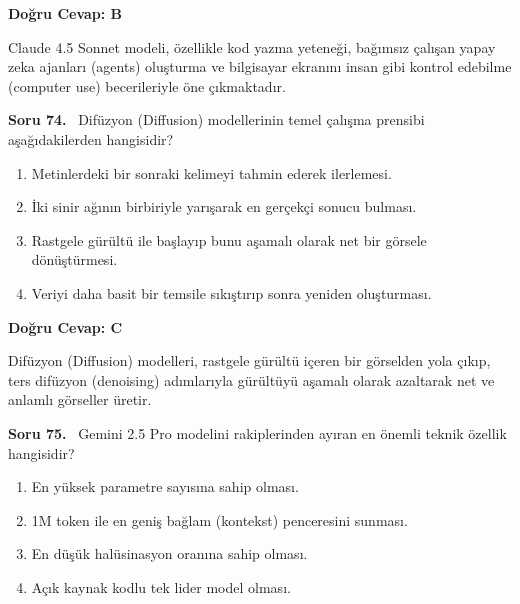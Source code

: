 \documentclass[11pt,a4paper,openany]{book}
\begin{document}
\vspace{4pt}
\begin{tcolorbox}[title=Cevap ve Açıklama, colback=gray!3!white, colframe=primarycolor!90!black, arc=2mm, fonttitle=\bfseries\sffamily, top=6pt, bottom=6pt]
    \textbf{Doğru Cevap: B}

    \vspace{2pt}
    Claude 4.5 Sonnet modeli, özellikle kod yazma yeteneği, bağımsız çalışan yapay zeka ajanları (agents) oluşturma ve bilgisayar ekranını insan gibi kontrol edebilme (computer use) becerileriyle öne çıkmaktadır.
\end{tcolorbox}
\vspace{10pt}
\needspace{5cm}
\vspace{8pt}
\noindent\textbf{\large\sffamily Soru 74.} \ Difüzyon (Diffusion) modellerinin temel çalışma prensibi aşağıdakilerden hangisidir?

\begin{enumerate}[label=\Alph*), leftmargin=25pt, topsep=4pt, itemsep=2pt]
        \item Metinlerdeki bir sonraki kelimeyi tahmin ederek ilerlemesi.
        \item İki sinir ağının birbiriyle yarışarak en gerçekçi sonucu bulması.
        \item Rastgele gürültü ile başlayıp bunu aşamalı olarak net bir görsele dönüştürmesi.
        \item Veriyi daha basit bir temsile sıkıştırıp sonra yeniden oluşturması.
\end{enumerate}

\vspace{4pt}
\begin{tcolorbox}[title=Cevap ve Açıklama, colback=gray!3!white, colframe=primarycolor!90!black, arc=2mm, fonttitle=\bfseries\sffamily, top=6pt, bottom=6pt]
    \textbf{Doğru Cevap: C}

    \vspace{2pt}
    Difüzyon (Diffusion) modelleri, rastgele gürültü içeren bir görselden yola çıkıp, ters difüzyon (denoising) adımlarıyla gürültüyü aşamalı olarak azaltarak net ve anlamlı görseller üretir.
\end{tcolorbox}
\vspace{10pt}
\needspace{5cm}
\vspace{8pt}
\noindent\textbf{\large\sffamily Soru 75.} \ Gemini 2.5 Pro modelini rakiplerinden ayıran en önemli teknik özellik hangisidir?

\begin{enumerate}[label=\Alph*), leftmargin=25pt, topsep=4pt, itemsep=2pt]
        \item En yüksek parametre sayısına sahip olması.
        \item 1M token ile en geniş bağlam (kontekst) penceresini sunması.
        \item En düşük halüsinasyon oranına sahip olması.
        \item Açık kaynak kodlu tek lider model olması.
\end{enumerate}
\end{document}
